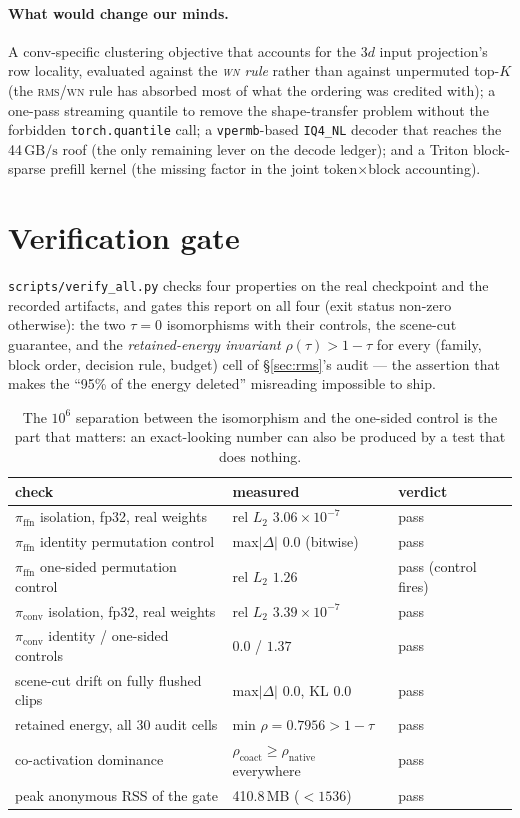 \documentclass[11pt]{article}
\newcommand{\pif}{\pi_{\mathrm{ffn}}}
\newcommand{\pic}{\pi_{\mathrm{conv}}}
\newcommand{\code}[1]{\texttt{\small #1}}
\newcommand{\gbps}{\ensuremath{\,\mathrm{GB/s}}}
\newcommand{\rms}{\textsc{rms}}
\newcommand{\wn}{\textsc{wn}}
\begin{document}
\paragraph{What would change our minds.} A conv-specific clustering objective that accounts
for the $3d$ input projection's row locality, evaluated against the \emph{\wn{} rule} rather
than against unpermuted top-$K$ (the \rms/\wn{} rule has absorbed most of what the ordering
was credited with); a one-pass streaming quantile to remove the shape-transfer problem
without the forbidden \code{torch.quantile} call; a \code{vpermb}-based \code{IQ4\_NL}
decoder that reaches the 44\gbps{} roof (the only remaining lever on the decode ledger); and
a Triton block-sparse prefill kernel (the missing factor in the joint token$\times$block
accounting).


\section{Verification gate}
\code{scripts/verify\_all.py} checks four properties on the real checkpoint and the
recorded artifacts, and gates this report on all four (exit status non-zero otherwise): the
two $\tau{=}0$ isomorphisms with their controls, the scene-cut guarantee, and the
\emph{retained-energy invariant} $\rho(\tau)>1-\tau$ for every (family, block order,
decision rule, budget) cell of \S\ref{sec:rms}'s audit --- the assertion that makes the
``95\% of the energy deleted'' misreading impossible to ship.
\begin{table}[h]\centering\small
\begin{tabular}{lll}
\toprule
check & measured & verdict \\
\midrule
$\pif$ isolation, fp32, real weights & rel $L_2$ $3.06\times10^{-7}$ & pass \\
$\pif$ identity permutation control & max$|\Delta|$ $0.0$ (bitwise) & pass \\
$\pif$ one-sided permutation control & rel $L_2$ $1.26$ & pass (control fires) \\
$\pic$ isolation, fp32, real weights & rel $L_2$ $3.39\times10^{-7}$ & pass \\
$\pic$ identity / one-sided controls & $0.0$ / $1.37$ & pass \\
scene-cut drift on fully flushed clips & max$|\Delta|$ $0.0$, KL $0.0$ & pass \\
retained energy, all 30 audit cells & min $\rho=0.7956>1-\tau$ & pass \\
co-activation dominance & $\rho_{\text{coact}}\ge\rho_{\text{native}}$ everywhere & pass \\
peak anonymous RSS of the gate & 410.8\,MB ($<1536$) & pass \\
\bottomrule
\end{tabular}
\caption{The $10^{6}$ separation between the isomorphism and the one-sided control is the
part that matters: an exact-looking number can also be produced by a test that does nothing.}
\end{table}
\end{document}
